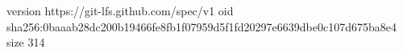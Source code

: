 version https://git-lfs.github.com/spec/v1
oid sha256:0baaab28dc200b19466fe8fb1f07959d5f1fd20297e6639dbe0c107d675ba8e4
size 314
